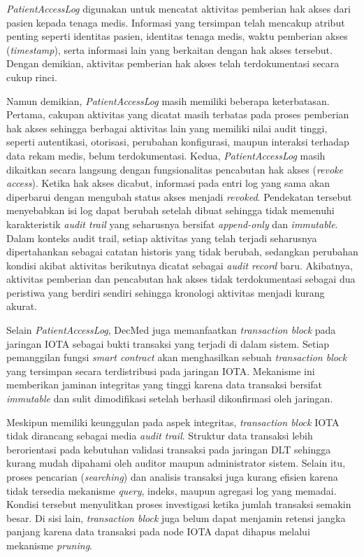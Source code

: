 \textit{PatientAccessLog} digunakan untuk mencatat aktivitas pemberian hak akses dari pasien kepada tenaga medis. Informasi yang tersimpan telah mencakup atribut penting seperti identitas pasien, identitas tenaga medis, waktu pemberian akses (\textit{timestamp}), serta informasi lain yang berkaitan dengan hak akses tersebut. Dengan demikian, aktivitas pemberian hak akses telah terdokumentasi secara cukup rinci.

Namun demikian, \textit{PatientAccessLog} masih memiliki beberapa keterbatasan. Pertama, cakupan aktivitas yang dicatat masih terbatas pada proses pemberian hak akses sehingga berbagai aktivitas lain yang memiliki nilai audit tinggi, seperti autentikasi, otorisasi, perubahan konfigurasi, maupun interaksi terhadap data rekam medis, belum terdokumentasi. Kedua, \textit{PatientAccessLog} masih dikaitkan secara langsung dengan fungsionalitas pencabutan hak akses (\textit{revoke access}). Ketika hak akses dicabut, informasi pada entri log yang sama akan diperbarui dengan mengubah status akses menjadi \textit{revoked}. Pendekatan tersebut menyebabkan isi log dapat berubah setelah dibuat sehingga tidak memenuhi karakteristik \textit{audit trail} yang seharusnya bersifat \textit{append-only} dan \textit{immutable}. Dalam konteks audit trail, setiap aktivitas yang telah terjadi seharusnya dipertahankan sebagai catatan historis yang tidak berubah, sedangkan perubahan kondisi akibat aktivitas berikutnya dicatat sebagai \textit{audit record} baru. Akibatnya, aktivitas pemberian dan pencabutan hak akses tidak terdokumentasi sebagai dua peristiwa yang berdiri sendiri sehingga kronologi aktivitas menjadi kurang akurat.

Selain \textit{PatientAccessLog}, DecMed juga memanfaatkan \textit{transaction block} pada jaringan IOTA sebagai bukti transaksi yang terjadi di dalam sistem. Setiap pemanggilan fungsi \textit{smart contract} akan menghasilkan sebuah \textit{transaction block} yang tersimpan secara terdistribusi pada jaringan IOTA. Mekanisme ini memberikan jaminan integritas yang tinggi karena data transaksi bersifat \textit{immutable} dan sulit dimodifikasi setelah berhasil dikonfirmasi oleh jaringan.

Meskipun memiliki keunggulan pada aspek integritas, \textit{transaction block} IOTA tidak dirancang sebagai media \textit{audit trail}. Struktur data transaksi lebih berorientasi pada kebutuhan validasi transaksi pada jaringan DLT sehingga kurang mudah dipahami oleh auditor maupun administrator sistem. Selain itu, proses pencarian (\textit{searching}) dan analisis transaksi juga kurang efisien karena tidak tersedia mekanisme \textit{query}, indeks, maupun agregasi log yang memadai. Kondisi tersebut menyulitkan proses investigasi ketika jumlah transaksi semakin besar. Di sisi lain, \textit{transaction block} juga belum dapat menjamin retensi jangka panjang karena data transaksi pada node IOTA dapat dihapus melalui mekanisme \textit{pruning}.

